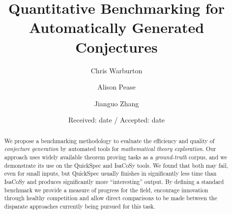 \title{Quantitative Benchmarking for Automatically Generated Conjectures%
}


\author{Chris Warburton \and
        Alison Pease    \and
        Jianguo Zhang}



\date{Received: date / Accepted: date}

\maketitle

\begin{abstract}
  We propose a benchmarking methodology to evaluate the efficiency and quality
  of \emph{conjecture generation} by automated tools for \emph{mathematical
    theory exploration}. Our approach uses widely available theorem proving
  tasks as a \emph{ground-truth} corpus, and we demonstrate its use on the
  QuickSpec and IsaCoSy tools. We found that both may fail, even for small
  inputs, but QuickSpec usually finishes in significantly less time than IsaCoSy
  and produces significantly more ``interesting'' output. By defining a standard
  benchmark we provide a measure of progress for the field, encourage
  innovation through healthy competition and allow direct comparisons to be made
  between the disparate approaches currently being pursued for this task.
\end{abstract}


